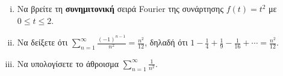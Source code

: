 \begin{mybox3}
  \begin{example}
  \item{}
  \item{}
    \begin{enumerate}[i)]
      \item Να βρείτε τη \textbf{συνημιτονική} σειρά Fourier της συνάρτησης 
        $ f(t)=t^{2} $ με $ 0 \leq t \leq 2 $.
      \item Να δείξετε ότι $ \sum_{n=1}^{\infty} \frac{(-1)^{n-1}}{n^{2}} = 
        \frac{n^{2}}{12} $, δηλαδή ότι $ 1 - \frac{1}{4} + \frac{1}{9} - \frac{1}{16}
        + \cdots = \frac{n^{2}}{12} $.
      \item Να υπολογίσετε το άθροισμα $ \sum_{n=1}^{\infty} \frac{1}{n^{2}} $. 
    \end{enumerate}
  \end{example} 
\end{mybox3}
